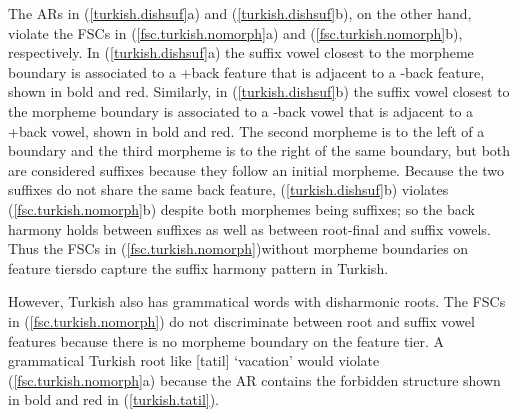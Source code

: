 \documentclass[,doc,floatsintext]{apa6}
\theoremstyle{definition}
\theoremstyle{definition}
\theoremstyle{definition}
\theoremstyle{remark}
\begin{document}
\noindent The ARs in (\ref{turkish.dishsuf}a) and
(\ref{turkish.dishsuf}b), on the other hand, violate the FSCs in
(\ref{fsc.turkish.nomorph}a) and (\ref{fsc.turkish.nomorph}b),
respectively. In (\ref{turkish.dishsuf}a) the suffix vowel closest to
the morpheme boundary is associated to a +back feature that is adjacent
to a -back feature, shown in bold and red. Similarly, in
(\ref{turkish.dishsuf}b) the suffix vowel closest to the morpheme
boundary is associated to a -back vowel that is adjacent to a +back
vowel, shown in bold and red. The second morpheme is to the left of a
boundary and the third morpheme is to the right of the same boundary,
but both are considered suffixes because they follow an initial
morpheme. Because the two suffixes do not share the same back feature,
(\ref{turkish.dishsuf}b) violates (\ref{fsc.turkish.nomorph}b) despite
both morphemes being suffixes; so the back harmony holds between
suffixes as well as between root-final and suffix vowels. Thus the FSCs
in (\ref{fsc.turkish.nomorph})\textemdash without morpheme boundaries on
feature tiers\textemdash do capture the suffix harmony pattern in
Turkish.

However, Turkish also has grammatical words with disharmonic roots. The
FSCs in (\ref{fsc.turkish.nomorph}) do not discriminate between root and
suffix vowel features because there is no morpheme boundary on the
feature tier. A grammatical Turkish root like {[}tatil{]} `vacation'
would violate (\ref{fsc.turkish.nomorph}a) because the AR contains the
forbidden structure shown in bold and red in (\ref{turkish.tatil}).

\begin{exe}
 \label{turkish.tatil} \\
\end{exe}
\end{document}
